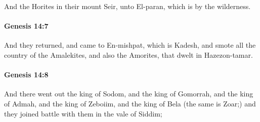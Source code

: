 			And the Horites in their mount Seir, unto El-paran, which is by the wilderness.


		\paragraph{Genesis 14:7} %
			\label{GENESIS-14-7}

			And they returned, and came to En-mishpat, which is Kadesh, and smote all the country of the Amalekites, and also the Amorites, that dwelt in Hazezon-tamar.


		\paragraph{Genesis 14:8} %
			\label{GENESIS-14-8}

			And there went out the king of Sodom, and the king of Gomorrah, and the king of Admah, and the king of Zeboiim, and the king of Bela (the same is Zoar;) and they joined battle with them in the vale of Siddim;


